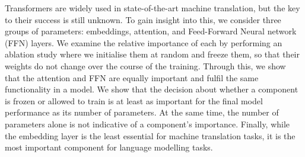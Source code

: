 Transformers are widely used in state-of-the-art machine translation, but the key to their success is still unknown. To gain insight into this, we consider three groups of parameters: embeddings, attention, and Feed-Forward Neural network (FFN) layers. We examine the relative importance of each by performing an ablation study where we initialise them at random and freeze them, so that their weights do not change over the course of the training. Through this, we show that the attention and FFN are equally important and fulfil the same functionality in a model. We show that the decision about whether a component is frozen or allowed to train is at least as important for the final model performance as its number of parameters. At the same time, the number of parameters alone is not indicative of a component's importance. Finally, while the embedding layer is the least essential for machine translation tasks, it is the most important component for language modelling tasks.
